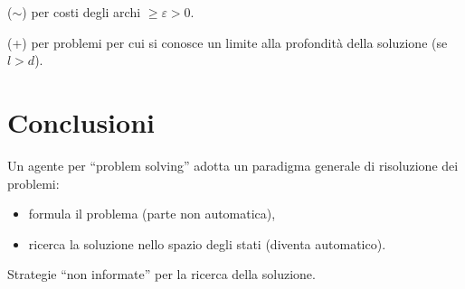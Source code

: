 \noindent($\sim$) per costi degli archi $ \geq \varepsilon > 0$.

\noindent(+) per problemi per cui si conosce un limite alla profondità della soluzione (se $l >d$).

\section{Conclusioni}
Un agente per ``problem solving'' adotta un paradigma generale di risoluzione dei problemi:\
\begin{itemize}
	\item formula il problema (parte non automatica),
	\item ricerca la soluzione nello spazio degli stati (diventa automatico).
\end{itemize}
Strategie ``non informate'' per la ricerca della soluzione.\

